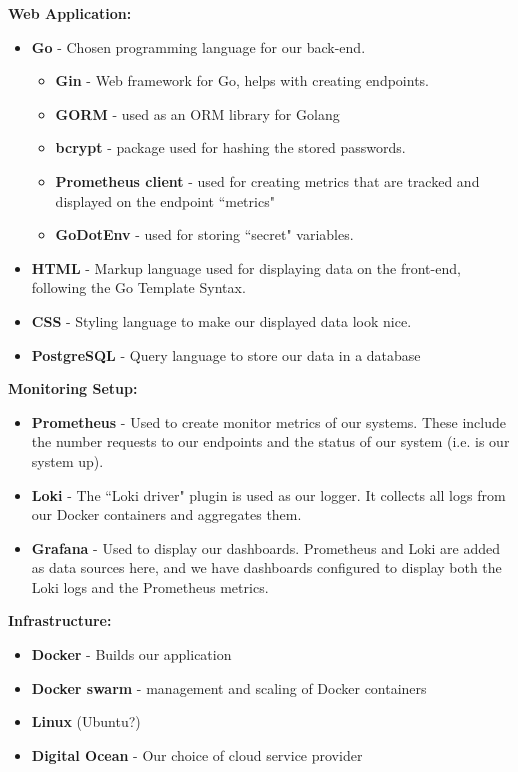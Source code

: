 \textbf{Web Application:}
\begin{itemize}
    \item \textbf{Go} - Chosen programming language for our back-end.
    \begin{itemize}
        \item \textbf{Gin} - Web framework for Go, helps with creating endpoints.
        \item \textbf{GORM} - used as an ORM library for Golang
        \item \textbf{bcrypt} - package used for hashing the stored passwords.
        \item \textbf{Prometheus client} - used for creating metrics that are tracked and displayed on the endpoint ``metrics"
        \item \textbf{GoDotEnv} - used for storing ``secret" variables.
    \end{itemize}
    \item \textbf{HTML} - Markup language used for displaying data on the front-end, following the Go Template Syntax.
    \item \textbf{CSS} - Styling language to make our displayed data look nice.
    \item \textbf{PostgreSQL} - Query language to store our data in a database
\end{itemize}
\textbf{Monitoring Setup:}
\begin{itemize}
    \item \textbf{Prometheus} - Used to create monitor metrics of our systems. These include the number requests to our endpoints and the status of our system (i.e. is our system up).
    \item \textbf{Loki} - The ``Loki driver" plugin is used as our logger. It collects all logs from our Docker containers and aggregates them.
    \item \textbf{Grafana} - Used to display our dashboards. Prometheus and Loki are added as data sources here, and we have dashboards configured to display both the Loki logs and the Prometheus metrics.
\end{itemize}
\textbf{Infrastructure:}
\begin{itemize}
    \item \textbf{Docker} - Builds our application 
    \item \textbf{Docker swarm} - management and scaling of Docker containers
    \item \textbf{Linux} (Ubuntu?)
    \item \textbf{Digital Ocean} - Our choice  of cloud service provider
\end{itemize}
